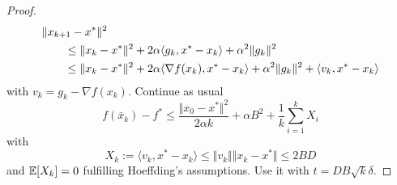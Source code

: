 \documentclass[aspectratio=149]{beamer}
\begin{document}
\begin{frame}
  \begin{adjustwidth}{-1.5em}{-1.5em}
    \begin{minipage}{1.1\textwidth}
    \begin{proof}
      \begin{equation}
        \begin{aligned}
          \MoveEqLeft \Vert x_{k+1} - x^* \Vert^2 \\
          &\le \Vert x_k-x^* \Vert^2 + 2 \alpha \langle g_k, x^*-x_k \rangle + \alpha^2 \Vert g_k \Vert^2 \\
          &\le \Vert x_k-x^* \Vert^2 + 2 \alpha \langle \nabla f(x_k), x^*-x_k \rangle + \alpha^2 \Vert g_k \Vert^2  + \langle v_k, x^*-x_k \rangle\\
        \end{aligned}
      \end{equation}
      with $v_k = g_k -\nabla f(x_k)$.
      Continue as usual
      \begin{equation}
        f(\bar{x}_k) - f^* \le \frac{\Vert x_0-x^* \Vert^2}{2 \alpha k} + \alpha B^2 + \frac{1}{k} \sum_{i=1}^{k} X_i
      \end{equation}
      with
      \begin{equation}
        X_k := \langle v_k, x^*-x_k \rangle \le \Vert v_k \Vert \Vert x_k-x^* \Vert \le 2BD
      \end{equation}
      and $\mathbb{E}[X_k]=0$ fulfilling Hoeffding's assumptions. Use it with $t= DB \sqrt{k}\delta$.
    \end{proof}
    \end{minipage}
  \end{adjustwidth}
\end{frame}
\end{document}
